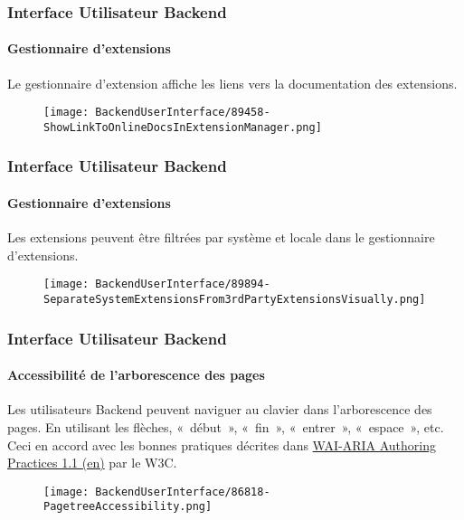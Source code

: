 
\begin{frame}[fragile]
	\frametitle{Interface Utilisateur Backend}
	\framesubtitle{Gestionnaire d'extensions}

	Le gestionnaire d'extension affiche les liens vers la documentation des extensions.

	\begin{figure}
		\texttt{[image: BackendUserInterface/89458-ShowLinkToOnlineDocsInExtensionManager.png]}
	\end{figure}

\end{frame}


\begin{frame}[fragile]
	\frametitle{Interface Utilisateur Backend}
	\framesubtitle{Gestionnaire d'extensions}

	Les extensions peuvent être filtrées par système et locale dans le gestionnaire d'extensions.

	\begin{figure}
		\texttt{[image: BackendUserInterface/89894-SeparateSystemExtensionsFrom3rdPartyExtensionsVisually.png]}
	\end{figure}

\end{frame}


\begin{frame}[fragile]
	\frametitle{Interface Utilisateur Backend}
	\framesubtitle{Accessibilité de l'arborescence des pages}

	Les utilisateurs Backend peuvent naviguer au clavier dans l'arborescence des pages.
	En utilisant les flèches, «~début~», «~fin~», «~entrer~», «~espace~», etc.
	\newline
	Ceci en accord avec les bonnes pratiques décrites dans
	\href{https://www.w3.org/TR/wai-aria-practices-1.1/#keyboard-interaction-22}{WAI-ARIA Authoring Practices 1.1 (en)}
	par le W3C\@.

	\begin{figure}
		\texttt{[image: BackendUserInterface/86818-PagetreeAccessibility.png]}
	\end{figure}

\end{frame}

